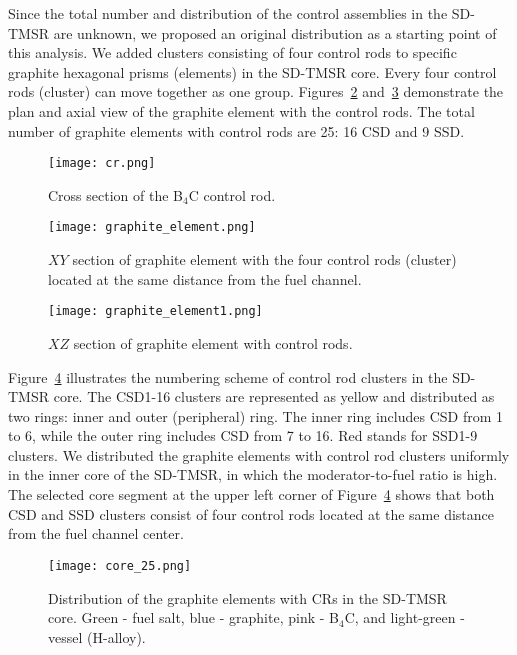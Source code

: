 Since the total number and distribution of the control assemblies in the SD-TMSR are unknown, we proposed an original distribution as a starting point of this analysis. We added clusters consisting of four control rods to specific graphite hexagonal prisms (elements) in the SD-TMSR core. Every four control rods (cluster) can move together as one group. Figures~\ref{fig:graphite_elemen} and~\ref{fig:graphite_elemen1} demonstrate the plan and axial view of the graphite element with the control rods. The total number of graphite elements with control rods are 25: 16 CSD and 9 SSD.
\begin{figure}[t!]  %
	\centering
	\hspace{+0.65in} 
	\texttt{[image: cr.png]}
	\caption{Cross section of the B$_4$C control rod.}
	\label{fig:cr}
\end{figure}
\begin{figure}[t!]  %
	\centering
	\hspace{+0.65in}
	\texttt{[image: graphite\_element.png]}
	\caption{$XY$ section of graphite element with the four control rods 
	(cluster) located at the same distance from the fuel channel.}
	\label{fig:graphite_elemen}
\end{figure}
\begin{figure}[t!]  %
	\centering
	\hspace{+0.65in}
	\texttt{[image: graphite\_element1.png]}
	\caption{$XZ$ section of graphite element with control rods.}
	\label{fig:graphite_elemen1}
\end{figure}

Figure~\ref{fig:core_25} illustrates the numbering scheme of control rod 
clusters in the SD-TMSR core.
The CSD1-16 clusters are represented as yellow and distributed as two rings: inner and outer (peripheral) ring. The inner ring includes CSD from 1 to 6, while the outer ring includes CSD from 7 to 16. Red stands for SSD1-9 clusters.
We distributed the graphite elements with control rod clusters uniformly in 
the inner core of the SD-TMSR, in which the moderator-to-fuel ratio is high.
The selected core segment at the upper left corner of 
Figure~\ref{fig:core_25} shows that both CSD and SSD clusters consist of four 
control rods located at the same distance from the fuel channel center.
\begin{figure}[t!]  %
	\centering
	\hspace{+0.65in}
	\texttt{[image: core\_25.png]}
	\caption{Distribution of the graphite elements with CRs in the SD-TMSR core. Green - fuel salt, blue - graphite, pink - B$_4$C, and light-green - vessel (H-alloy).}
	\label{fig:core_25}
\end{figure}

